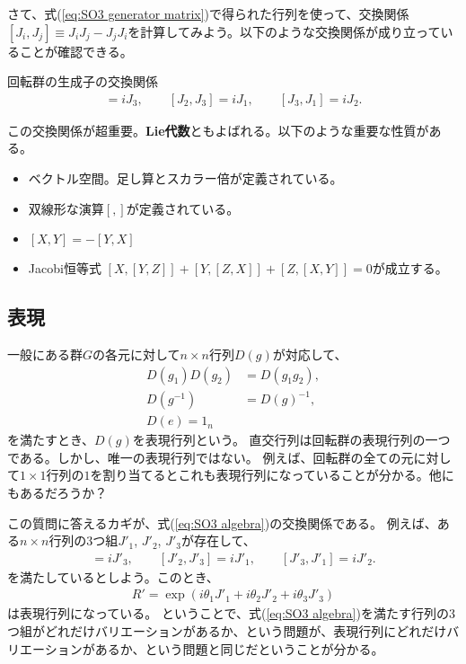 \documentclass[10pt,a4paper]{jarticle}
\begin{document}
さて、式(\ref{eq:SO3 generator matrix})で得られた行列を使って、交換関係$[J_i, J_j]\equiv J_i J_j - J_j J_i$を計算してみよう。以下のような交換関係が成り立っていることが確認できる。
\begin{itembox}[l]{回転群の生成子の交換関係}
\begin{align}
[J_1, J_2] = i J_3, \qquad
[J_2, J_3] = i J_1, \qquad
[J_3, J_1] = i J_2. \label{eq:SO3 algebra}
\end{align}
\end{itembox}
この交換関係が超重要。\textbf{Lie代数}ともよばれる。以下のような重要な性質がある。
\begin{itemize}
\item ベクトル空間。足し算とスカラー倍が定義されている。
\item 双線形な演算$[,]$が定義されている。
\item $[X,Y] = -[Y,X]$
\item Jacobi恒等式 $[X,[Y,Z]] + [Y, [Z,X]] + [Z,[X,Y]] = 0$が成立する。
\end{itemize}

\subsection{表現}
一般にある群$G$の各元に対して$n \times n$行列$D(g)$が対応して、
\begin{align}
D(g_1) D(g_2) &= D(g_1 g_2), \\
D(g^{-1}) &= D(g)^{-1}, \\
D(e) = 1_n
\end{align}
を満たすとき、$D(g)$を表現行列という。
直交行列は回転群の表現行列の一つである。しかし、唯一の表現行列ではない。
例えば、回転群の全ての元に対して$1\times 1$行列の$1$を割り当てるとこれも表現行列になっていることが分かる。他にもあるだろうか？

この質問に答えるカギが、式(\ref{eq:SO3 algebra})の交換関係である。
例えば、ある$n\times n$行列の3つ組$J'_1$, $J'_2$, $J'_3$が存在して、
\begin{align}
[J'_1, J'_2] = i J'_3, \qquad
[J'_2, J'_3] = i J'_1, \qquad
[J'_3, J'_1] = i J'_2.
\end{align}
を満たしているとしよう。このとき、
\begin{align}
R' = \exp\left( i \theta_1 J'_1 + i \theta_2 J'_2 + i\theta_3 J'_3 \right)
\end{align}
は表現行列になっている。
ということで、式(\ref{eq:SO3 algebra})を満たす行列の3つ組がどれだけバリエーションがあるか、という問題が、表現行列にどれだけバリエーションがあるか、という問題と同じだということが分かる。
\end{document}
